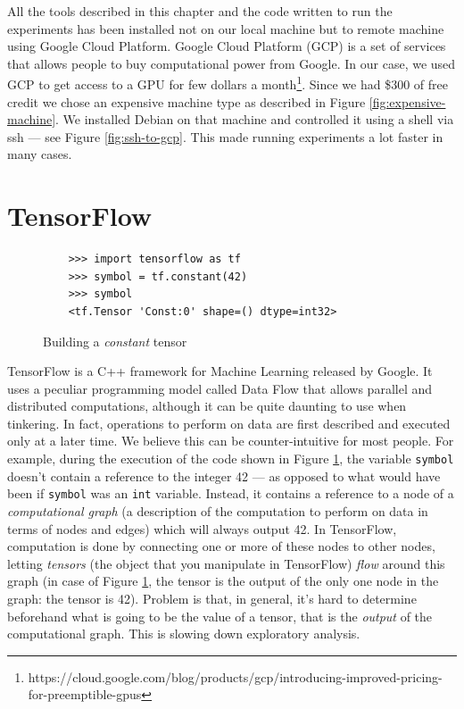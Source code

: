 All the tools described in this chapter and the code written to run the
experiments has been installed not on our local machine but to remote
machine using Google Cloud Platform. Google Cloud Platform (GCP) is a
set of services that allows people to buy computational power from
Google. In our case, we used GCP to get access to a GPU for few dollars
a
month\footnote{https://cloud.google.com/blog/products/gcp/introducing-improved-pricing-for-preemptible-gpus}.
Since we had \$300 of free credit we chose an expensive machine type as
described in Figure \ref{fig:expensive-machine}. We installed Debian on
that machine and controlled it using a shell via ssh --- see Figure
\ref{fig:ssh-to-gcp}. This made running experiments a lot faster in
many cases.

\section{TensorFlow}
\label{sec:tensorflow}

\begin{figure}
  \begin{verbatim}
    >>> import tensorflow as tf
    >>> symbol = tf.constant(42)
    >>> symbol
    <tf.Tensor 'Const:0' shape=() dtype=int32>
  \end{verbatim}
  \caption{Building a \emph{constant} tensor}
  \label{fig:fortytwo}
\end{figure}

TensorFlow is a C++ framework for Machine Learning released by Google.
It uses a peculiar programming model called Data Flow that allows
parallel and distributed computations, although it can be quite
daunting to use when tinkering. In fact, operations to perform on data
are first described and executed only at a later time. We believe this
can be counter-intuitive for most people. For example, during the
execution of the code shown in Figure \ref{fig:fortytwo}, the variable
\texttt{symbol} doesn't contain a reference to the integer 42 --- as
opposed to what would have been if \texttt{symbol} was an \texttt{int}
variable. Instead, it contains a reference to a node of a
\emph{computational graph} (a description of the computation to perform
on data in terms of nodes and edges) which will always output 42. In
TensorFlow, computation is done by connecting one or more of these nodes
to other nodes, letting \emph{tensors} (the object that you manipulate
in TensorFlow) \emph{flow} around this
graph (in case of Figure \ref{fig:fortytwo}, the tensor is the output
of the only one node in the graph: the tensor is 42). Problem is that,
in general, it's hard to
determine beforehand what is going to be the value of a tensor, that is the
\emph{output} of the computational graph. This is slowing down
exploratory analysis.

